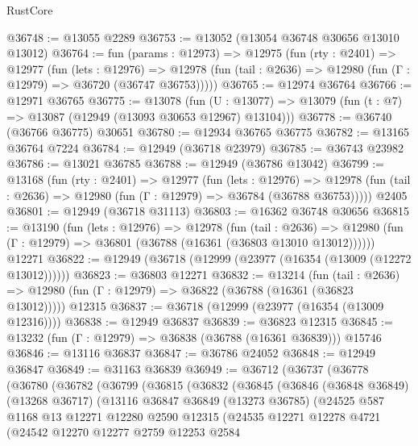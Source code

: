 \begin{lexlean}{RustCore}
\begin{coremodule}
@36748 := @13055 @2289
@36753 := @13052 (@13054 @36748 @30656 @13010 @13012)
@36764 := fun (params : @12973) =>
  @12975
    (fun (rty : @2401) =>
    @12977
      (fun (lets : @12976) =>
      @12978 (fun (tail : @2636) => @12980 (fun (Γ : @12979) => @36720 (@36747 @36753)))))
@36765 := @12974 @36764
@36766 := @12971 @36765
@36775 := @13078
    (fun (U : @13077) => @13079 (fun (t : @7) => @13087 (@12949 (@13093 @30653 @12967) @13104)))
@36778 := @36740 (@36766 @36775) @30651
@36780 := @12934 @36765 @36775
@36782 := @13165 @36764 @7224
@36784 := @12949 (@36718 @23979)
@36785 := @36743 @23982
@36786 := @13021 @36785
@36788 := @12949 (@36786 @13042)
@36799 := @13168
    (fun (rty : @2401) =>
    @12977
      (fun (lets : @12976) =>
      @12978 (fun (tail : @2636) => @12980 (fun (Γ : @12979) => @36784 (@36788 @36753)))))
    @2405
@36801 := @12949 (@36718 @31113)
@36803 := @16362 @36748 @30656
@36815 := @13190
    (fun (lets : @12976) =>
    @12978
      (fun (tail : @2636) =>
      @12980 (fun (Γ : @12979) => @36801 (@36788 (@16361 (@36803 @13010 @13012))))))
    @12271
@36822 := @12949 (@36718 (@12999 (@23977 (@16354 (@13009 (@12272 @13012))))))
@36823 := @36803 @12271
@36832 := @13214
    (fun (tail : @2636) => @12980 (fun (Γ : @12979) => @36822 (@36788 (@16361 (@36823 @13012)))))
    @12315
@36837 := @36718 (@12999 (@23977 (@16354 (@13009 @12316))))
@36838 := @12949 @36837
@36839 := @36823 @12315
@36845 := @13232 (fun (Γ : @12979) => @36838 (@36788 (@16361 @36839))) @15746
@36846 := @13116 @36837
@36847 := @36786 @24052
@36848 := @12949 @36847
@36849 := @31163 @36839
@36949 := @36712
    (@36737
      (@36778
        (@36780
          (@36782
            (@36799
              (@36815
                (@36832
                  (@36845
                    (@36846
                      (@36848 @36849)
                      (@13268 @36717)
                      (@13116
                        @36847
                        @36849
                        (@13273 @36785)
                        (@24525
                          @587
                          @1168
                          @13
                          @12271
                          @12280
                          @2590
                          @12315
                          (@24535
                            @12271
                            @12278
                            @4721
                            (@24542
                              @12270
                              @12277
                              @2759
                              @12253
                              @2584

\end{coremodule}
\end{lexlean}
